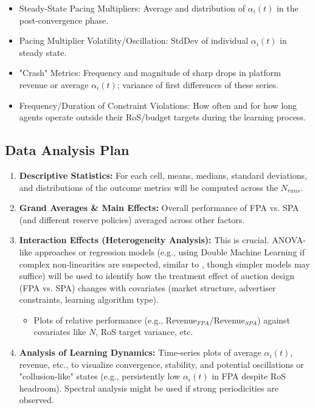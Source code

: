 \documentclass[12pt, a4paper]{article}
\begin{document}
\begin{itemize}
\begin{itemize}
            \item Steady-State Pacing Multipliers: Average and distribution of $\alpha_i(t)$ in the post-convergence phase.
            \item Pacing Multiplier Volatility/Oscillation: StdDev of individual $\alpha_i(t)$ in steady state.
            \item "Crash" Metrics: Frequency and magnitude of sharp drops in platform revenue or average $\alpha_i(t)$; variance of first differences of these series.
            \item Frequency/Duration of Constraint Violations: How often and for how long agents operate outside their RoS/budget targets during the learning process.
        \end{itemize}
\end{itemize}

\subsection{Data Analysis Plan}
\begin{enumerate}
    \item \textbf{Descriptive Statistics:} For each cell, means, medians, standard deviations, and distributions of the outcome metrics will be computed across the $N_{runs}$.
    \item \textbf{Grand Averages \& Main Effects:} Overall performance of FPA vs. SPA (and different reserve policies) averaged across other factors.
    \item \textbf{Interaction Effects (Heterogeneity Analysis):} This is crucial. ANOVA-like approaches or regression models (e.g., using Double Machine Learning if complex non-linearities are suspected, similar to \cite{Rawat2025AlgorithmicCollusion}, though simpler models may suffice) will be used to identify how the treatment effect of auction design (FPA vs. SPA) changes with covariates (market structure, advertiser constraints, learning algorithm type).
        \begin{itemize}
            \item Plots of relative performance (e.g., Revenue$_{FPA}$/Revenue$_{SPA}$) against covariates like $N$, RoS target variance, etc.
        \end{itemize}
    \item \textbf{Analysis of Learning Dynamics:} Time-series plots of average $\alpha_i(t)$, revenue, etc., to visualize convergence, stability, and potential oscillations or "collusion-like" states (e.g., persistently low $\alpha_i(t)$ in FPA despite RoS headroom). Spectral analysis might be used if strong periodicities are observed.
\end{enumerate}
\end{document}
